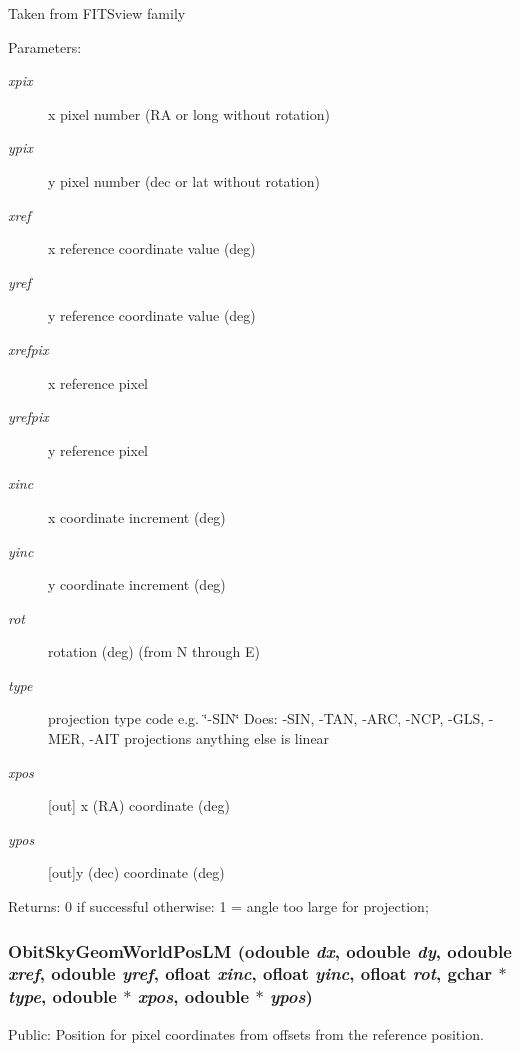 Taken from FITSview family \begin{Desc}
\item[Parameters:]
\begin{description}
\item[{\em xpix}]x pixel number (RA or long without rotation) \item[{\em ypix}]y pixel number (dec or lat without rotation) \item[{\em xref}]x reference coordinate value (deg) \item[{\em yref}]y reference coordinate value (deg) \item[{\em xrefpix}]x reference pixel \item[{\em yrefpix}]y reference pixel \item[{\em xinc}]x coordinate increment (deg) \item[{\em yinc}]y coordinate increment (deg) \item[{\em rot}]rotation (deg) (from N through E) \item[{\em type}]projection type code e.g. \char`\"{}-SIN\char`\"{} Does: -SIN, -TAN, -ARC, -NCP, -GLS, -MER, -AIT projections anything else is linear \item[{\em xpos}][out] x (RA) coordinate (deg) \item[{\em ypos}][out]y (dec) coordinate (deg) \end{description}
\end{Desc}
\begin{Desc}
\item[Returns:]0 if successful otherwise: 1 = angle too large for projection; \end{Desc}
\subsubsection{ Obit\-Sky\-Geom\-World\-Pos\-LM ({\bf odouble} {\em dx}, {\bf odouble} {\em dy}, {\bf odouble} {\em xref}, {\bf odouble} {\em yref}, {\bf ofloat} {\em xinc}, {\bf ofloat} {\em yinc}, {\bf ofloat} {\em rot}, gchar $\ast$ {\em type}, {\bf odouble} $\ast$ {\em xpos}, {\bf odouble} $\ast$ {\em ypos})}\label{ObitSkyGeom_8c_a10}


Public: Position for pixel coordinates from offsets from the reference position. 

